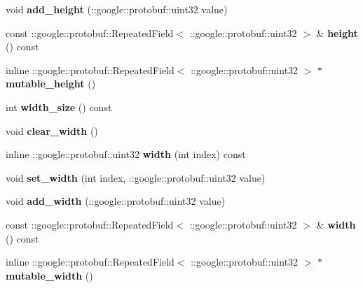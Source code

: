 \begin{DoxyCompactItemize}
\item 
\mbox{\label{classcaffe_1_1_dummy_data_parameter_a93c09f380b03fd8f45eea764fe6f5550}} 
void {\bfseries add\+\_\+height} (\+::google\+::protobuf\+::uint32 value)
\item 
\mbox{\label{classcaffe_1_1_dummy_data_parameter_a1bc6d4890e6f6e5a4b3ee9307931eedb}} 
const \+::google\+::protobuf\+::\+Repeated\+Field$<$ \+::google\+::protobuf\+::uint32 $>$ \& {\bfseries height} () const
\item 
\mbox{\label{classcaffe_1_1_dummy_data_parameter_a362ba7c8881988073ff35a9819dec56d}} 
inline \+::google\+::protobuf\+::\+Repeated\+Field$<$ \+::google\+::protobuf\+::uint32 $>$ $\ast$ {\bfseries mutable\+\_\+height} ()
\item 
\mbox{\label{classcaffe_1_1_dummy_data_parameter_a5c1cf9561a02ad73cc6ba552447945e2}} 
int {\bfseries width\+\_\+size} () const
\item 
\mbox{\label{classcaffe_1_1_dummy_data_parameter_a978a99d9b5ffaa073acdea99c9b41ecb}} 
void {\bfseries clear\+\_\+width} ()
\item 
\mbox{\label{classcaffe_1_1_dummy_data_parameter_a1b546d5cea6f765c442f19586f5b864f}} 
inline \+::google\+::protobuf\+::uint32 {\bfseries width} (int index) const
\item 
\mbox{\label{classcaffe_1_1_dummy_data_parameter_a6a4a3e7bdebaf156aee4327ce7ae18f3}} 
void {\bfseries set\+\_\+width} (int index, \+::google\+::protobuf\+::uint32 value)
\item 
\mbox{\label{classcaffe_1_1_dummy_data_parameter_aadaa71a20fc19722a34c33e57b681bea}} 
void {\bfseries add\+\_\+width} (\+::google\+::protobuf\+::uint32 value)
\item 
\mbox{\label{classcaffe_1_1_dummy_data_parameter_a1150324b778a4cf7f323f4e886f945aa}} 
const \+::google\+::protobuf\+::\+Repeated\+Field$<$ \+::google\+::protobuf\+::uint32 $>$ \& {\bfseries width} () const
\item 
\mbox{\label{classcaffe_1_1_dummy_data_parameter_aaf2dfd00c83c48633567d8dd92380cc4}} 
inline \+::google\+::protobuf\+::\+Repeated\+Field$<$ \+::google\+::protobuf\+::uint32 $>$ $\ast$ {\bfseries mutable\+\_\+width} ()
\end{DoxyCompactItemize}

